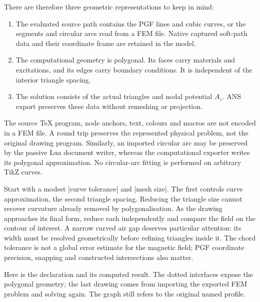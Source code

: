 There are therefore three geometric representations to keep in mind:
\begin{enumerate}
\item The evaluated source path contains the PGF lines and cubic curves, or
      the segments and circular arcs read from a FEM file. Native captured
      soft-path data and their coordinate frame are retained in the model.
\item The computational geometry is polygonal. Its faces carry materials and
      excitations, and its edges carry boundary conditions. It is independent
      of the interior triangle spacing.
\item The solution consists of the actual triangles and nodal potential $A_z$.
      ANS export preserves these data without remeshing or projection.
\end{enumerate}

The source TeX program, node anchors, text, colours and macros are not encoded
in a FEM file. A round trip preserves the represented physical problem, not the
original drawing program. Similarly, an imported circular arc may be preserved
by the passive Lua document writer, whereas the computational exporter writes
its polygonal approximation. No circular-arc fitting is performed on arbitrary
TikZ curves.

Start with a modest |curve tolerance| and |mesh size|. The first controls curve
approximation, the second triangle spacing. Reducing the triangle size cannot
recover curvature already removed by polygonalisation. As the drawing approaches
its final form, reduce each independently and compare the field on the contour
of interest. A narrow curved air gap deserves particular attention: its width
must be resolved geometrically before refining triangles inside it.
The chord tolerance is not a global error estimate for the magnetic field;
PGF coordinate precision, snapping and constructed intersections also matter.

Here is the declaration and its computed result. The dotted interfaces expose the polygonal geometry;
the last drawing comes from importing the exported FEM problem and solving again.
The graph still refers to the original named profile.


